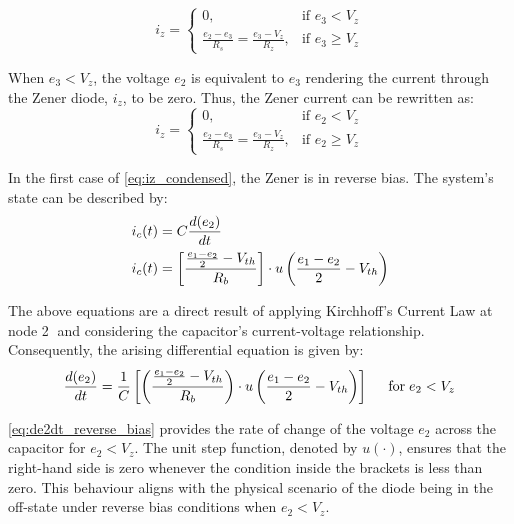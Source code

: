 \begin{equation}
	i_z = \begin{cases}
		0, & \text{if } e_3 < V_z \\
		\frac{e_2 - e_3}{R_s}=\frac{e_3 - V_z}{R_z}, & \text{if } e_3 \geq V_z
	\end{cases}
    \label{eq:iz_reverse_bias}
\end{equation}

When $e_3 < V_z$, the voltage $e_2$ is equivalent to $e_3$ rendering the current through the Zener diode, $i_z$, to be zero. Thus, the Zener current can be rewritten as:
\begin{equation}
    i_z=\begin{cases}
        0,  & \text{if } e_2 < V_z \\
        \frac{e_2-e_3}{R_s}=\frac{e_3-V_z}{R_z}, & \text{if } e_2 \geq V_z
    \end{cases}
    \label{eq:iz_condensed}
\end{equation}

In the first case of \eqref{eq:iz_condensed}, the Zener is in reverse bias. The system's state can be described by:
\begin{equation}
    \begin{split}
        i_c(t) &= C\frac{d(e_2)}{dt} \\
        i_c(t) &= \left[\frac{\frac{e_1 - e_2}{2} - V_{th}}{R_b} \right]\cdot u\left(\frac{e_1 - e_2}{2} - V_{th} \right)
    \end{split}
    \label{eq:ic_reverse_bias}
\end{equation}

\pagebreak
The above equations are a direct result of applying Kirchhoff's Current Law at node \textcircled{2} and considering the capacitor's current-voltage relationship. Consequently, the arising differential equation is given by:
\begin{equation}
     \frac{d(e_2)}{dt}=\frac{1}{C} \left[\left(\frac{\frac{e_1 - e_2}{2} - V_{th}}{R_b} \right) \cdot u\left(\frac{e_1-e_2}{2}-V_{th} \right) \right] \hspace{0.5cm} \text{for} \hspace{0.1cm} e_2 < V_z
    \label{eq:de2dt_reverse_bias}
\end{equation}

\eqref{eq:de2dt_reverse_bias} provides the rate of change of the voltage $e_2$ across the capacitor for $e_2 < V_z$. The unit step function, denoted by $u(\cdot)$, ensures that the right-hand side is zero whenever the condition inside the brackets is less than zero. This behaviour aligns with the physical scenario of the diode being in the off-state under reverse bias conditions when $e_2 < V_z$.

